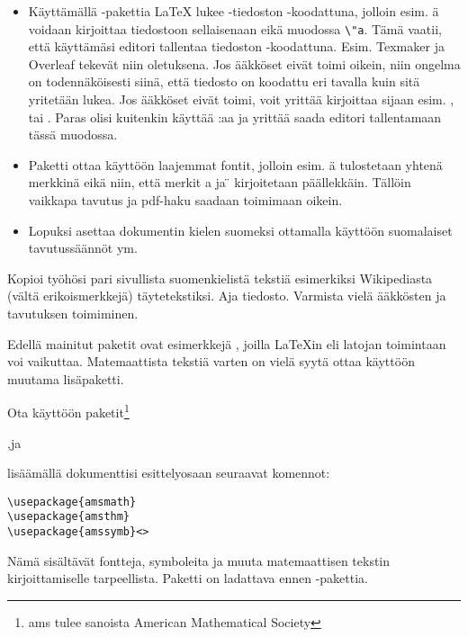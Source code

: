 \begin{fframe}
    \begin{extra}
        \begin{itemize}
            \item Käyttämällä -pakettia \LaTeX{} lukee -tiedoston -koodattuna, jolloin esim. ä voidaan kirjoittaa tiedostoon sellaisenaan eikä muodossa \lstinline-\"a-. Tämä vaatii, että käyttämäsi editori tallentaa tiedoston -koodattuna. Esim. Texmaker ja Overleaf tekevät niin oletuksena. Jos ääkköset eivät toimi oikein, niin ongelma on todennäköisesti siinä, että tiedosto on koodattu eri tavalla kuin sitä yritetään lukea. Jos ääkköset eivät toimi, voit yrittää kirjoittaa \cns{[utf8]} sijaan esim. \cns{[latin1]}, \cns{[ansinew]} tai \cns{[applemac]}. Paras olisi kuitenkin käyttää \cns{[utf8]}:aa ja yrittää saada editori tallentamaan tässä muodossa.
            \item Paketti  ottaa käyttöön laajemmat fontit, jolloin esim. ä tulostetaan yhtenä merkkinä eikä niin, että merkit a ja \"{} kirjoitetaan päällekkäin. Tällöin vaikkapa tavutus ja pdf-haku saadaan toimimaan oikein.
            \item Lopuksi  asettaa dokumentin kielen suomeksi ottamalla käyttöön suomalaiset tavutussäännöt ym.
        \end{itemize}
    \end{extra}
\end{fframe}

\begin{fframe}
    \begin{harj}
        Kopioi työhösi pari sivullista suomenkielistä tekstiä esimerkiksi Wikipediasta (vältä erikoismerkkejä) täytetekstiksi. Aja tiedosto. Varmista vielä ääkkösten ja tavutuksen toimiminen. 
    \end{harj}
\end{fframe}

\begin{fframe}
    Edellä mainitut paketit ovat esimerkkejä , joilla \LaTeX in eli latojan toimintaan voi vaikuttaa. 
    \pause
    Matemaattista tekstiä varten on vielä syytä ottaa käyttöön muutama lisäpaketti. 
    \begin{harj}
        Ota käyttöön paketit\footnote{ams tulee sanoista American Mathematical Society}
        \begin{center}
            ,\quad {}\quad ja\quad {}
        \end{center}
        lisäämällä dokumenttisi esittelyosaan seuraavat komennot:
        \begin{lstlisting}
\usepackage{amsmath}
\usepackage{amsthm}
\usepackage{amssymb}<>
        \end{lstlisting}
        \pause
        Nämä sisältävät fontteja, symboleita ja muuta matemaattisen tekstin kirjoittamiselle tarpeellista. Paketti  on ladattava ennen -pakettia.
    \end{harj}
\end{fframe}

